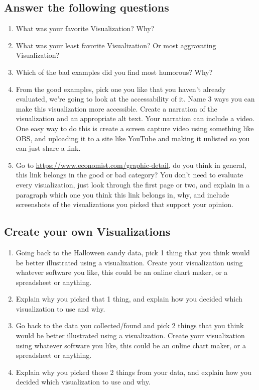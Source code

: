 \documentclass[12pt]{article}
\begin{document}
\subsection*{Answer the following questions}


    \begin{enumerate}
        \item What was your favorite Visualization? Why? 
        \item What was your least favorite Visualization? Or most aggravating Visualization?
        \item Which of the bad examples did you find most humorous? Why?
        \item From the good examples, pick one you like that you haven't already evaluated, we're going to look at the accessability of it. Name 3 ways you can make this visualization more accessible.  Create a narration of the visualization and an appropriate alt text.  Your narration can include a video.  One easy way to do this is create a screen capture video using something like OBS, and uploading it to a site like YouTube and making it unlisted so you can just share a link. 
        \item Go to \url{https://www.economist.com/graphic-detail}, do you think in general, this link belongs in the good or bad category? You don't need to evaluate every visualization, just look through the first page or two, and explain in a paragraph which one you think this link belongs in, why, and include screenshots of the visualizations you picked that support your opinion.
    \end{enumerate}


    \subsection*{Create your own Visualizations}
    \begin{enumerate}
        \item Going back to the Halloween candy data, pick 1 thing that you think would be better illustrated using a visualization.  Create your visualization using whatever software you like, this could be an online chart maker, or a spreadsheet or anything. 
        \item Explain why you picked that 1 thing, and explain how you decided which visualization to use and why.
        \item Go back to the data you collected/found and pick 2 things that you think would be better illustrated using a visualization. Create your visualization using whatever software you like, this could be an online chart maker, or a spreadsheet or anything. 
        \item Explain why you picked those 2 things from your data, and explain how you decided which visualization to use and why.
    \end{enumerate}
\end{document}

